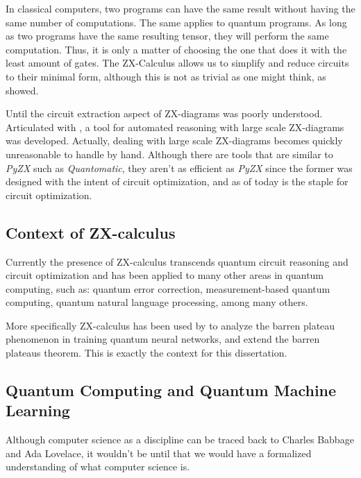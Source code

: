In classical computers, two programs can have the same result without having the same number of computations. The same applies to quantum programs. As long as two programs have the same resulting tensor, they will perform the same computation. Thus, it is only a matter of choosing the one that does it with the least amount of gates. The ZX-Calculus allows us to simplify and reduce circuits to their minimal form, although this is not as trivial as one might think, as \cite{https://doi.org/10.4230/lipics.icalp.2022.119} showed. 

Until \cite{Duncan2020graphtheoretic} the circuit extraction aspect of ZX-diagrams was poorly understood. Articulated with \cite{kissinger2020pyzx}, a tool for automated reasoning with large scale ZX-diagrams was developed. Actually, dealing with large scale ZX-diagrams becomes quickly unreasonable to handle by hand. Although there are tools that are similar to \textit{PyZX} such as \textit{Quantomatic}, they aren't as efficient as \textit{PyZX} since the former was designed with the intent of circuit optimization, and as of today is the staple for circuit optimization.



\subsection{Context of ZX-calculus}



Currently the presence of ZX-calculus transcends quantum circuit reasoning and circuit optimization and has been applied to many other areas in quantum computing, such as: quantum error correction, measurement-based quantum computing, quantum natural language processing, among many others.

More specifically ZX-calculus has been used by \cite{Zhao_2021} to analyze the barren plateau phenomenon in training quantum neural networks, and extend the barren plateaus theorem. This is exactly the context for this dissertation.




\subsection{Quantum Computing and Quantum Machine Learning}

Although computer science as a discipline can be traced back to Charles Babbage and Ada Lovelace, it wouldn't be until \cite{Turing1936-TUROCN} that we would have a formalized understanding of what computer science is. 

